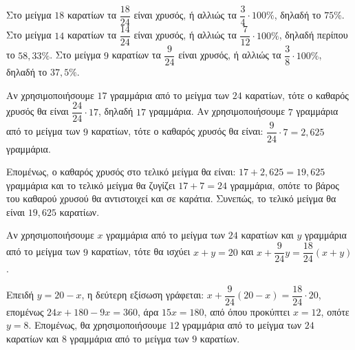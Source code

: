
\begin{alist}
\item Στο μείγμα $18$ καρατίων τα $\dfrac{18}{24}$ είναι χρυσός, ή αλλιώς τα $\dfrac{3}{4} \cdot 100\%$, δηλαδή το $75\%$. Στο μείγμα $14$ καρατίων τα $\dfrac{14}{24}$ είναι χρυσός, ή αλλιώς τα $\dfrac{7}{12} \cdot 100\%$, δηλαδή περίπου το $58,33\%$.
Στο μείγμα $9$ καρατίων τα $\dfrac{9}{24}$ είναι χρυσός, ή αλλιώς τα $\dfrac{3}{8} \cdot 100\%$, δηλαδή το $37,5\%$.

\item Αν χρησιμοποιήσουμε $17$ γραμμάρια από το μείγμα των $24$ καρατίων, τότε ο καθαρός
χρυσός θα είναι $\dfrac{24}{24} \cdot 17$, δηλαδή $17$ γραμμάρια. Αν χρησιμοποιήσουμε $7$ γραμμάρια από το
μείγμα των $9$ καρατίων, τότε ο καθαρός χρυσός θα είναι: $\dfrac{9}{24} \cdot 7 = 2,625$ γραμμάρια.

Επομένως, ο καθαρός χρυσός στο τελικό μείγμα θα είναι: $17 + 2,625 = 19,625$ γραμμάρια και το τελικό μείγμα θα ζυγίζει $17 + 7 = 24$ γραμμάρια, οπότε το βάρος του καθαρού χρυσού θα αντιστοιχεί και σε καράτια. Συνεπώς, το τελικό μείγμα θα είναι $19,625$
καρατίων.

\item Αν χρησιμοποιήσουμε $x$ γραμμάρια από το μείγμα των $24$ καρατίων και $y$ γραμμάρια από το μείγμα των $9$ καρατίων, τότε θα ισχύει $x + y = 20$ και $x + \dfrac{9}{24} y = \dfrac{18}{24}(x + y)$.

Επειδή $y = 20 - x$, η δεύτερη εξίσωση γράφεται:
$x + \dfrac{9}{24}(20 - x) = \dfrac{18}{24} \cdot 20$, επομένως $24x + 180 - 9x = 360$, άρα $15x = 180$, από
όπου προκύπτει $x = 12$, οπότε $y = 8$. Επομένως, θα χρησιμοποιήσουμε $12$ γραμμάρια από το μείγμα των $24$ καρατίων και $8$ γραμμάρια από το μείγμα των $9$ καρατίων.
\end{alist}

